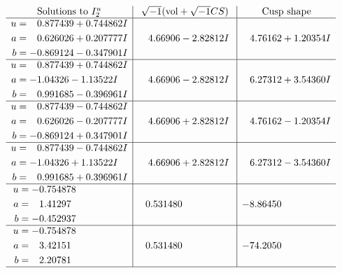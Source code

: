 \documentclass[1p]{elsarticle_modified}
\theoremstyle{definition}
\newcommand{\I}{\sqrt{-1}}
\begin{document}
$$\begin{array}{c|c|c}  
\text{Solutions to }I^u_{2}& \I (\text{vol} + \sqrt{-1}CS) & \text{Cusp shape}\\
 \hline 
\begin{aligned}
u &= \phantom{-}0.877439 + 0.744862 I \\
a &= \phantom{-}0.626026 + 0.207777 I \\
b &= -0.869124 - 0.347901 I\end{aligned}
 & \phantom{-}4.66906 - 2.82812 I & \phantom{-}4.76162 + 1.20354 I \\ \hline\begin{aligned}
u &= \phantom{-}0.877439 + 0.744862 I \\
a &= -1.04326 - 1.13522 I \\
b &= \phantom{-}0.991685 - 0.396961 I\end{aligned}
 & \phantom{-}4.66906 - 2.82812 I & \phantom{-}6.27312 + 3.54360 I \\ \hline\begin{aligned}
u &= \phantom{-}0.877439 - 0.744862 I \\
a &= \phantom{-}0.626026 - 0.207777 I \\
b &= -0.869124 + 0.347901 I\end{aligned}
 & \phantom{-}4.66906 + 2.82812 I & \phantom{-}4.76162 - 1.20354 I \\ \hline\begin{aligned}
u &= \phantom{-}0.877439 - 0.744862 I \\
a &= -1.04326 + 1.13522 I \\
b &= \phantom{-}0.991685 + 0.396961 I\end{aligned}
 & \phantom{-}4.66906 + 2.82812 I & \phantom{-}6.27312 - 3.54360 I \\ \hline\begin{aligned}
u &= -0.754878\phantom{ +0.000000I} \\
a &= \phantom{-}1.41297\phantom{ +0.000000I} \\
b &= -0.452937\phantom{ +0.000000I}\end{aligned}
 & \phantom{-}0.531480\phantom{ +0.000000I} & -8.86450\phantom{ +0.000000I} \\ \hline\begin{aligned}
u &= -0.754878\phantom{ +0.000000I} \\
a &= \phantom{-}3.42151\phantom{ +0.000000I} \\
b &= \phantom{-}2.20781\phantom{ +0.000000I}\end{aligned}
 & \phantom{-}0.531480\phantom{ +0.000000I} & -74.2050\phantom{ +0.000000I}\\
 \hline 
 \end{array}$$\newpage\newpage\renewcommand{\arraystretch}{1}
\end{document}
